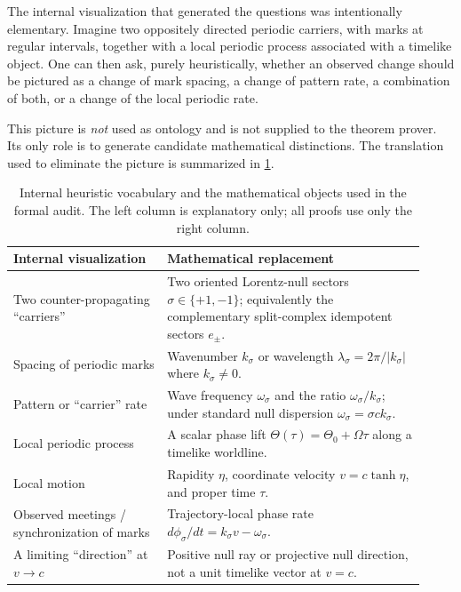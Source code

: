 \documentclass[11pt,a4paper]{article}
\begin{document}
The internal visualization that generated the questions was intentionally elementary.  Imagine two oppositely directed periodic carriers, with marks at regular intervals, together with a local periodic process associated with a timelike object.  One can then ask, purely heuristically, whether an observed change should be pictured as a change of mark spacing, a change of pattern rate, a combination of both, or a change of the local periodic rate.

This picture is \emph{not} used as ontology and is not supplied to the theorem prover.  Its only role is to generate candidate mathematical distinctions.  The translation used to eliminate the picture is summarized in \cref{tab:translation}.

\begin{table}[ht]
\centering
\caption{Internal heuristic vocabulary and the mathematical objects used in the formal audit.  The left column is explanatory only; all proofs use only the right column.}
\label{tab:translation}
\begin{tabular}{>{\raggedright\arraybackslash}p{0.34\linewidth} >{\raggedright\arraybackslash}p{0.58\linewidth}}
\toprule
Internal visualization & Mathematical replacement \\
\midrule
Two counter-propagating ``carriers'' & Two oriented Lorentz-null sectors $\sigma\in\{+1,-1\}$; equivalently the complementary split-complex idempotent sectors $e_\pm$.\\
Spacing of periodic marks & Wavenumber $k_\sigma$ or wavelength $\lambda_\sigma=2\pi/|k_\sigma|$ where $k_\sigma\neq0$.\\
Pattern or ``carrier'' rate & Wave frequency $\omega_\sigma$ and the ratio $\omega_\sigma/k_\sigma$; under standard null dispersion $\omega_\sigma=\sigma c k_\sigma$.\\
Local periodic process & A scalar phase lift $\Theta(\tau)=\Theta_0+\Omega\tau$ along a timelike worldline.\\
Local motion & Rapidity $\eta$, coordinate velocity $v=c\tanh\eta$, and proper time $\tau$.\\
Observed meetings / synchronization of marks & Trajectory-local phase rate $d\phi_\sigma/dt=k_\sigma v-\omega_\sigma$.\\
A limiting ``direction'' at $v\to c$ & Positive null ray or projective null direction, not a unit timelike vector at $v=c$.\\
\bottomrule
\end{tabular}
\end{table}
\end{document}
